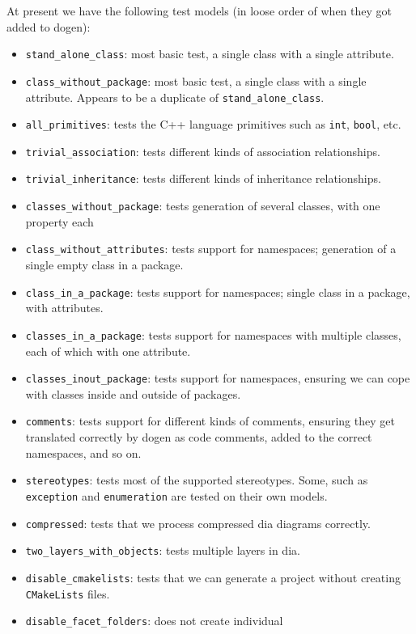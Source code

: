 \documentclass{book}
\begin{document}
At present we have the following test models (in loose order of when
they got added to dogen):

\begin{itemize}
\item \texttt{stand\_alone\_class}: most basic test, a single class
  with a single attribute.
\item \texttt{class\_without\_package}: most basic test, a single
  class with a single attribute. Appears to be a duplicate of
  \texttt{stand\_alone\_class}.
\item \texttt{all\_primitives}: tests the C++ language primitives such
  as \texttt{int}, \texttt{bool}, etc.
\item \texttt{trivial\_association}: tests different kinds of
  association relationships.
\item \texttt{trivial\_inheritance}: tests different kinds of
  inheritance relationships.
\item \texttt{classes\_without\_package}: tests generation of several
  classes, with one property each
\item \texttt{class\_without\_attributes}: tests support for
  namespaces; generation of a single empty class in a package.
\item \texttt{class\_in\_a\_package}: tests support for namespaces;
  single class in a package, with attributes.
\item \texttt{classes\_in\_a\_package}: tests support for namespaces
  with multiple classes, each of which with one attribute.
\item \texttt{classes\_inout\_package}: tests support for namespaces,
  ensuring we can cope with classes inside and outside of packages.
\item \texttt{comments}: tests support for different kinds of
  comments, ensuring they get translated correctly by dogen as code
  comments, added to the correct namespaces, and so on.
\item \texttt{stereotypes}: tests most of the supported
  stereotypes. Some, such as \texttt{exception} and
  \texttt{enumeration} are tested on their own models.
\item \texttt{compressed}: tests that we process compressed dia
  diagrams correctly.
\item \texttt{two\_layers\_with\_objects}: tests multiple layers in
  dia.
\item \texttt{disable\_cmakelists}: tests that we can generate a
  project without creating \texttt{CMakeLists} files.
\item \texttt{disable\_facet\_folders}: does not create individual

\end{itemize}
\end{document}
